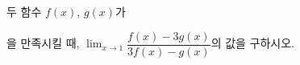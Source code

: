 두 함수 $f(x)$, $g(x)$가 \par\smallskip{}\par\smallskip\noindent 을 만족시킬 때, $\displaystyle\lim_{x\to 1}\dfrac{f(x)-3g(x)}{3f(x)-g(x)}$의 값을 구하시오.
